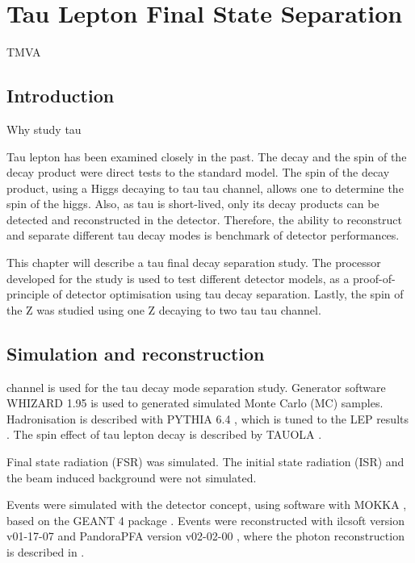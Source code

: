 \chapter{Tau Lepton Final State Separation}
\label{chap:Tau}

%
{TMVA}%


\section{Introduction}

Why study tau

Tau lepton has been examined closely in the past. The decay and the spin of the decay product were direct tests to the standard model. The spin of the decay product, using a Higgs decaying to tau tau channel, allows one to determine the spin of the higgs. Also, as tau is short-lived, only its decay products can be detected and reconstructed in the detector. Therefore, the ability to reconstruct and separate different tau decay modes is benchmark of detector performances.

This chapter will describe a tau final decay separation study. The processor developed for the study is used to test different detector models, as a proof-of-principle of detector optimisation using tau decay separation. Lastly, the spin of the Z was studied using one Z decaying to two tau tau channel.


\section{Simulation and reconstruction}

\eeToTauTau channel is used for the tau decay mode separation study. Generator software WHIZARD 1.95 \cite{whizard} is used to generated simulated Monte Carlo (MC) samples. Hadronisation is described with PYTHIA 6.4 \cite{Sjostrand:1995iq}, which is tuned to the LEP results \cite{}. The spin effect of tau lepton decay is described by TAUOLA \cite{Jadach:1993hs}.

Final state radiation (FSR) was simulated. The initial state radiation (ISR) and the beam induced background were not simulated.

Events were simulated with the \CLICILD detector concept, using software with MOKKA \cite{MoradeFreitas:2002kj}, based on the GEANT 4 package  \cite{Agostinelli:2002hh}.
Events were reconstructed with  ilcsoft version v01-17-07 \cite{Gaede:82475} and PandoraPFA version v02-02-00 \cite{Marshall:2015rfa}, where the photon reconstruction is described in \cite{Xu:2016rcz}.

